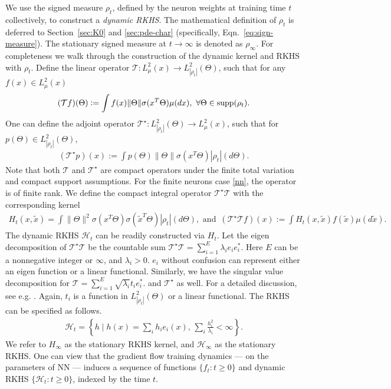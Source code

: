 \documentclass[11pt]{article}
\numberwithin{equation}{section}
\begin{document}
We use the signed measure $\rho_t$, defined by the neuron weights at training time $t$ collectively, to construct a \textit{dynamic RKHS}. The mathematical definition of $\rho_t$ is deferred to Section~\ref{sec:K0} and \ref{sec:pde-char} (specifically, Eqn.~\eqref{eq:sign-measure}). The stationary signed measure at $t\rightarrow \infty$ is denoted as $\rho_\infty$. 
For completeness we walk through the construction of the dynamic kernel and RKHS with $\rho_{t}$. Define the linear operator $\mathcal{T}: L^2_\mu(x) \rightarrow L^2_{|\rho_t|}(\Theta)$, such that for any $f(x) \in L^2_\mu(x)$
\begin{align*}
    (\mathcal{T} f)(\Theta) := \int f(x) \| \Theta \| \sigma(x^T\Theta) \mu(dx), ~\forall \Theta\in {\rm supp}(\rho_t).
\end{align*}
One can define the adjoint operator $\mathcal{T}^\star: L^2_{|\rho_t|}(\Theta) \rightarrow L^2_\mu(x)$, such that for $p(\Theta) \in L^2_{|\rho_t|}(\Theta)$, 
\begin{align*}
    (\mathcal{T}^\star p)(x) := \int p(\Theta) \| \Theta \| \sigma(x^T\Theta)  |\rho_t|(d \Theta).
\end{align*}
    Note that both $\mathcal{T}$ and $\mathcal{T}^\star$ are compact operators under the finite total variation and compact support assumptions. For the finite neurons case \eqref{nn}, the operator is of finite rank. We define the compact integral operator $\mathcal{T}^\star\mathcal{T}$ with the corresponding kernel
    \begin{align}\label{def:rkhs-kernel}
        H_t(x, \tilde{x}) = \int \| \Theta \|^2 \sigma(x^T\Theta) \sigma(\tilde x^T\Theta) |\rho_t|(d \Theta), \text{ and  }\,
        (\mathcal{T}^\star\mathcal{T} f) (x) := \int H_t(x,\tilde x)f(\tilde x)\mu(d \tilde x).
    \end{align}
    The dynamic RKHS $\mathcal{H}_t$ can be readily constructed via $H_t$. Let the eigen decomposition of $\mathcal{T}^\star\mathcal{T}$ be the countable sum
    $
        \mathcal{T}^\star\mathcal{T} = \sum_{i=1}^E \lambda_ie_ie_i^*.
    $
    Here $E$ can be a nonnegative integer or $\infty$, and $\lambda_i>0$. $e_i$ without confusion can represent either an eigen function or a linear functional. Similarly, we have the singular value decomposition for $\mathcal{T} = \sum_{i=1}^E \sqrt{\lambda_i}t_ie_i^*.$ and $\mathcal{T}^\star$ as well. For a detailed discussion, see e.g. \cite{casselman2014essays}. Again, $t_i$ is a function in $L^2_{|\rho_{t}|}(\Theta)$ or a linear functional. The RKHS can be specified as follows.
    \begin{align*}
        \mathcal{H}_t = \left\{ h \mid h(x) = \sum_i h_ie_i(x) \text{, } \sum_i \frac{h^2_i}{\lambda_i} < \infty \right\}.
    \end{align*}
    We refer to $H_\infty$ as the stationary RKHS kernel, and $\mathcal{H}_\infty$ as the stationary RKHS.
 One can view that the gradient flow training dynamics --- on the parameters of NN --- induces a sequence of functions $\{ f_t: t \geq 0\}$ and dynamic RKHS $\{ \mathcal{H}_t: t \geq 0\}$, indexed by the time $t$.
\end{document}
